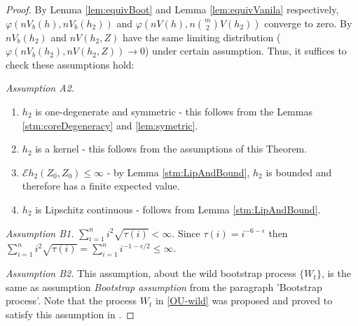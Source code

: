 \documentclass{article} %
\newcommand{\ev}{\mathcal{E}}
\begin{document}
\begin{proof}
By  Lemma \ref{lem:equivBoot} and Lemma \ref{lem:equivVanila} respectively, $\varphi(n V_b(h),n V_b(h_2))$ and $\varphi(nV(h),n \binom m 2 V(h_2))$ converge to zero. By \cite[Theorem 3.1]{leucht_dependent_2013} $n V_b(h_2)$ and $n V(h_2,Z)$ have the same limiting distribution ($\varphi(n V_b(h_2),n V(h_2,Z)) \to 0$) under certain assumption. Thus, it suffices to check these assumptions hold:

\textit{Assumption A2.}
\begin{enumerate}[label=\roman*]
\item $h_2$ is one-degenerate and symmetric - this follows from the Lemmas  \ref{stm:coreDegeneracy} and \ref{lem:symetric}. 
\item $h_2$ is a kernel - this follows from the assumptions of this Theorem.
\item $\ev h_2(Z_0,Z_0) \leq \infty$ - by Lemma \ref{stm:LipAndBound}, $h_2$ is bounded and therefore has a finite expected value.
\item  $h_2$ is Lipschitz continuous - follows from Lemma \ref{stm:LipAndBound}.
\end{enumerate}

\textit{Assumption B1.} $\sum_{i=1}^n i^2 \sqrt{\tau(i)} < \infty$. Since $\tau(i) = i^{-6-\epsilon}$ then $\sum_{i=1}^n i^2 \sqrt{\tau(i)} = \sum_{i=1}^n i^{-1 - \epsilon/2} \leq \infty$. 

\textit{Assumption B2.} This assumption, about the wild bootstrap process $\{W_t\}$, is the same as assumption \textit{Bootstrap assumption} from the paragraph 'Bootstrap process'. Note that the process $W_t$ in \eqref{OU-wild} was proposed and proved to satisfy this assumption in \cite[Remark 2]{leucht_dependent_2013}.
\end{proof}  
\end{document}
